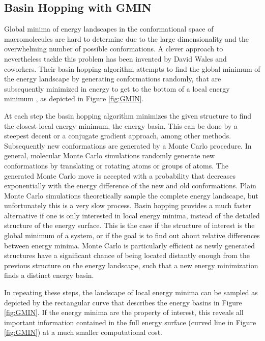 \documentclass[english, a4paper, 12pt, titlepage, draft]{article}
\begin{document}

\subsection{Basin Hopping with GMIN}

Global minima of energy landscapes in the conformational space of macromolecules are hard to determine due to the large dimensionality and the overwhelming number of possible conformations.
A clever approach to nevertheless tackle this problem has been invented by David Wales and coworkers.
Their basin hopping algorithm attempts to find the global minimum of the energy landscape by generating conformations randomly, that are subsequently minimized in energy to get to the bottom of a local energy minimum \cite{basinHopping}, as depicted in Figure \ref{fig:GMIN}.

At each step the basin hopping algorithm minimizes the given structure to find the closest local energy minimum, the energy basin.
This can be done by a steepest decent or a conjugate gradient approach, among other methods.
Subsequently new conformations are generated by a Monte Carlo procedure. 
In general, molecular Monte Carlo simulations randomly generate new conformations by translating or rotating atoms or groups of atoms.
The generated Monte Carlo move is accepted with a probability that decreases exponentially with the energy difference of the new and old conformations.
Plain Monte Carlo simulations theoretically sample the complete energy landscape, but unfortunately this is a very slow process.
Basin hopping provides a much faster alternative if one is only interested in local energy minima, instead of the detailed structure of the energy surface.
This is the case if the structure of interest is the global minimum of a system, or if the goal is to find out about relative differences between energy minima.
Monte Carlo is particularly efficient as newly generated structures have a significant chance of being located distantly enough from the previous structure on the energy landscape, such that a new energy minimization finds a distinct energy basin.

In repeating these steps, the landscape of local energy minima can be sampled as depicted by the rectangular curve that describes the energy basins in Figure \ref{fig:GMIN}.
If the energy minima are the property of interest, this reveals all important information contained in the full energy surface (curved line in Figure \ref{fig:GMIN}) at a much smaller computational cost.
\end{document}
